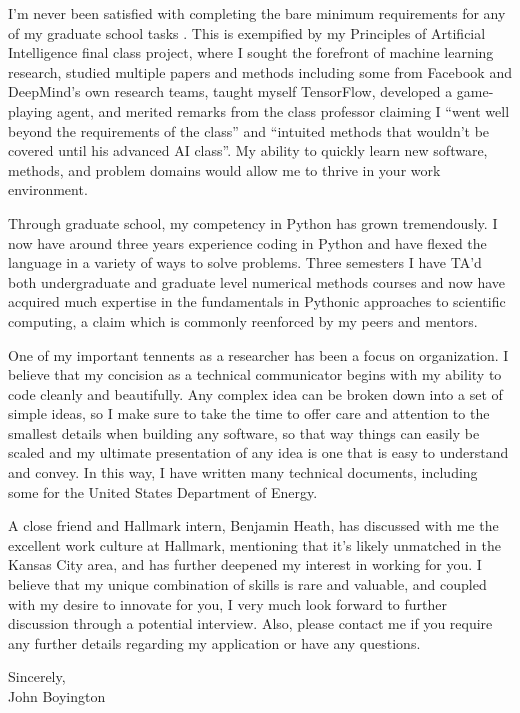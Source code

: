 \documentclass[margin, 10pt]{res} %
\begin{document}
\begin{resume}
I'm never been satisfied with completing the bare minimum requirements for any of my graduate school tasks .
This is exempified by my Principles of Artificial Intelligence final class project, where I sought the forefront of machine learning research, studied multiple papers and methods including some from Facebook and DeepMind's own research teams, taught myself TensorFlow, developed a game-playing agent, and merited remarks from the class professor claiming I ``went well beyond the requirements of the class'' and ``intuited methods that wouldn't be covered until his advanced AI class''.
My ability to quickly learn new software, methods, and problem domains would allow me to thrive in your work environment.

Through graduate school, my competency in Python has grown tremendously.
I now have around three years experience coding in Python and have flexed the language in a variety of ways to solve problems.
Three semesters I have TA'd both undergraduate and graduate level numerical methods courses and now have acquired much expertise in the fundamentals in Pythonic approaches to scientific computing, a claim which is commonly reenforced by my peers and mentors.

One of my important tennents as a researcher has been a focus on organization.
I believe that my concision as a technical communicator begins with my ability to code cleanly and beautifully.
Any complex idea can be broken down into a set of simple ideas, so I make sure to take the time to offer care and attention to the smallest details when building any software, so that way things can easily be scaled and my ultimate presentation of any idea is one that is easy to understand and convey.
In this way, I have written many technical documents, including some for the United States Department of Energy.


A close friend and Hallmark intern, Benjamin Heath, has discussed with me the excellent work culture at Hallmark, mentioning that it's likely unmatched in the Kansas City area, and has further deepened my interest in working for you.
I believe that my unique combination of skills is rare and valuable, and coupled with my desire to innovate for you, I very much look forward to further discussion through a potential interview.
Also, please contact me if you require any further details regarding my application or have any questions.


Sincerely,\\
John Boyington




\end{resume}
\end{document}
